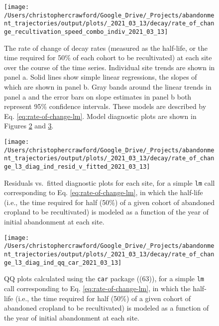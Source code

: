 \documentclass[9pt,twocolumn,twoside,lineno]{pnas-new}
\begin{document}
\begin{figure}
\texttt{[image: /Users/christophercrawford/Google\_Drive/\_Projects/abandonment\_trajectories/output/plots/\_2021\_03\_13/decay/rate\_of\_change\_recultivation\_speed\_combo\_indiv\_2021\_03\_13]} \caption{The rate of change of decay rates (measured as the half-life, or the time required for 50\% of each cohort to be recultivated) at each site over the course of the time series. Individual site trends are shown in panel a. Solid lines show simple linear regressions, the slopes of which are shown in panel b. Gray bands around the linear trends in panel a and the error bars on slope estimates in panel b both represent 95\% confidence intervals. These models are described by Eq. \eqref{eq:rate-of-change-lm}. Model diagnostic plots are shown in Figures \ref{fig:rate-of-change-diag-resid-fitted} and \ref{fig:rate-of-change-diag-qq}.}\label{fig:decay-rate-of-change}
\end{figure}



\begin{figure}
\texttt{[image: /Users/christophercrawford/Google\_Drive/\_Projects/abandonment\_trajectories/output/plots/\_2021\_03\_13/decay/rate\_of\_change\_l3\_diag\_ind\_resid\_v\_fitted\_2021\_03\_13]} \caption{Residuals vs.~fitted diagnostic plots for each site, for a simple \texttt{lm} call corresponding to Eq. \eqref{eq:rate-of-change-lm}, in which the half-life (i.e., the time required for half (50\%) of a given cohort of abandoned cropland to be recultivated) is modeled as a function of the year of initial abandonment at each site.}\label{fig:rate-of-change-diag-resid-fitted}
\end{figure}



\begin{figure}
\texttt{[image: /Users/christophercrawford/Google\_Drive/\_Projects/abandonment\_trajectories/output/plots/\_2021\_03\_13/decay/rate\_of\_change\_l3\_diag\_ind\_qq\_car\_2021\_03\_13]} \caption{QQ plots calculated using the \texttt{car} package ((63)), for a simple \texttt{lm} call corresponding to Eq. \eqref{eq:rate-of-change-lm}, in which the half-life (i.e., the time required for half (50\%) of a given cohort of abandoned cropland to be recultivated) is modeled as a function of the year of initial abandonment at each site.}\label{fig:rate-of-change-diag-qq}
\end{figure}
\end{document}
